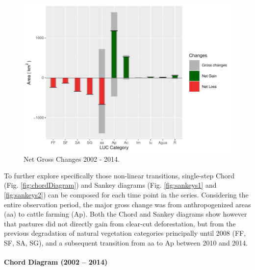 \begin{Schunk}
\begin{figure}[h]

{\centering \includegraphics[width=0.8\linewidth, height=0.5\linewidth]{figures/net_gross.pdf} 

}

\caption[Net Gross Changes 2002 - 2014]{Net Gross Changes 2002 - 2014.}\label{fig:ng_plot}
\end{figure}
\end{Schunk}

To further explore specifically those non-linear transitions,
single-step Chord (Fig. \ref{fig:chordDiagram}) and Sankey diagrams
(Fig. \ref{fig:sankeys1} and \ref{fig:sankeys2}) can be composed for
each time point in the series. Considering the entire observation
period, the major gross change was from anthropogenized areas (aa) to
cattle farming (Ap). Both the Chord and Sankey diagrams show however
that pastures did not directly gain from clear-cut deforestation, but
from the previous degradation of natural vegetation categories
principally until 2008 (FF, SF, SA, SG), and a subsequent transition
from aa to Ap between 2010 and 2014.

\hypertarget{chord-diagram-2002-2014}{%
\paragraph{Chord Diagram (2002 -- 2014)}\label{chord-diagram-2002-2014}}


